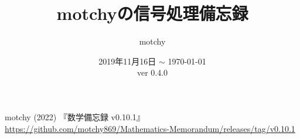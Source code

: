 \documentclass[dvipdfmx,uplatex,report]{jsbook} %
\theoremstyle{definition} %
\begin{document}
	\title{motchyの信号処理備忘録}
	\author{motchy}
	\date{ 2019年11月16日 $\sim$ \today \\ver 0.4.0}
	\maketitle
	{\scriptsize \tableofcontents}

	
	
	
	
	
	
	
	

	\begin{thebibliography}{9}
		motchy (2022) 『数学備忘録 v0.10.1』\url{https://github.com/motchy869/Mathematics-Memorandum/releases/tag/v0.10.1}
	\end{thebibliography}
\end{document}
